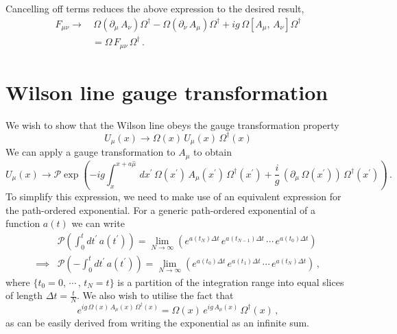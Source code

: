 Cancelling off terms reduces the above expression to the desired result,
%
\begin{align*}
F_{\mu\nu} \rightarrow &\, \Omega\left(\partial_\mu\,A_\nu\right)\Omega^\dagger - \Omega\left(\partial_\nu\,A_\mu\right)\Omega^\dagger +ig\,\Omega\left[A_\mu,\,A_\nu\right]\Omega^\dagger\\
&= \Omega\,F_{\mu\nu}\,\Omega^\dagger\, .
\end{align*}

\section{Wilson line gauge transformation}\label{app:WilsonLineGT}

We wish to show that the Wilson line obeys the gauge transformation property
%
\begin{equation}
U_\mu(x) \rightarrow \Omega(x)\,U_\mu(x)\,\Omega^\dagger(x)
\end{equation}
%
We can apply a gauge transformation to $A_\mu$ to obtain
%
\begin{equation}
U_\mu(x)\rightarrow\mathcal{P}\exp\left(-ig\int_{x}^{x+a\hat{\mu}}\,dx^\prime\, \Omega(x^\prime)\,A_\mu(x^\prime)\,\Omega^\dagger(x^\prime) + \frac{i}{g}\,(\partial_\mu\,\Omega(x^\prime))\,\Omega^\dagger(x^\prime)\right)\, .
\label{eq:WilsonLineGT(app)}
\end{equation}
%
To simplify this expression, we need to make use of an equivalent expression for the path-ordered exponential. For a generic path-ordered exponential of a function $a(t)$ we can write
%
\begin{align}
&\mathcal{P}\left(\int_0^t dt^\prime\, a(t^\prime)\right) = \lim_{N\rightarrow\infty} \left( e^{a(t_N)\Delta t}\,e^{a(t_{N-1})\Delta t}\,\cdots\,e^{a(t_0)\Delta t}\right)\nonumber\\
\implies &\mathcal{P}\left(-\int_0^t dt^\prime\, a(t^\prime)\right) = \lim_{N\rightarrow\infty} \left( e^{a(t_0)\Delta t}\,e^{a(t_{1})\Delta t}\,\cdots\,e^{a(t_N)\Delta t}\right)\, , \label{eq:OrderedExponentialLimit}
\end{align}
%
where $\lbrace t_0 = 0, \, \cdots\, , \, t_N = t\rbrace$ is a partition of the integration range into equal slices of length $\Delta t = \frac{t}{N}$. We also wish to utilise the fact that
%
\begin{equation}
e^{ig\,\Omega(x)\,A_\mu(x)\,\Omega^\dagger(x)} = \Omega(x)\,e^{ig\,A_\mu(x)}\,\Omega^\dagger(x)\, ,
\end{equation}
as can be easily derived from writing the exponential as an infinite sum.\\

